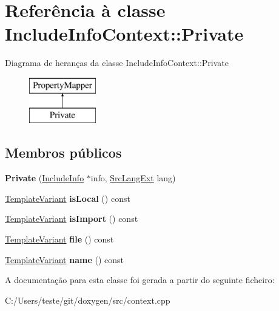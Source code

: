 \hypertarget{class_include_info_context_1_1_private}{\section{Referência à classe Include\-Info\-Context\-:\-:Private}
\label{class_include_info_context_1_1_private}
}
Diagrama de heranças da classe Include\-Info\-Context\-:\-:Private\begin{figure}[H]
\begin{center}
\leavevmode
\includegraphics[height=2.000000cm]{class_include_info_context_1_1_private}
\end{center}
\end{figure}
\subsection*{Membros públicos}
\begin{DoxyCompactItemize}
\item 
\hypertarget{class_include_info_context_1_1_private_a4fa02fa735d1d434b4f972f964b04adf}{{\bfseries Private} (\hyperlink{struct_include_info}{Include\-Info} $\ast$info, \hyperlink{types_8h_a9974623ce72fc23df5d64426b9178bf2}{Src\-Lang\-Ext} lang)}\label{class_include_info_context_1_1_private_a4fa02fa735d1d434b4f972f964b04adf}

\item 
\hypertarget{class_include_info_context_1_1_private_af21a845e4e534717dcceb26e91201278}{\hyperlink{class_template_variant}{Template\-Variant} {\bfseries is\-Local} () const }\label{class_include_info_context_1_1_private_af21a845e4e534717dcceb26e91201278}

\item 
\hypertarget{class_include_info_context_1_1_private_a9dc2271b895a155912149db56d6e6c4d}{\hyperlink{class_template_variant}{Template\-Variant} {\bfseries is\-Import} () const }\label{class_include_info_context_1_1_private_a9dc2271b895a155912149db56d6e6c4d}

\item 
\hypertarget{class_include_info_context_1_1_private_aa0b80d50e47142a9b9a0dd67fa4b2bb0}{\hyperlink{class_template_variant}{Template\-Variant} {\bfseries file} () const }\label{class_include_info_context_1_1_private_aa0b80d50e47142a9b9a0dd67fa4b2bb0}

\item 
\hypertarget{class_include_info_context_1_1_private_af98912d3b2af14adadc5c221338ec7e9}{\hyperlink{class_template_variant}{Template\-Variant} {\bfseries name} () const }\label{class_include_info_context_1_1_private_af98912d3b2af14adadc5c221338ec7e9}

\end{DoxyCompactItemize}


A documentação para esta classe foi gerada a partir do seguinte ficheiro\-:\begin{DoxyCompactItemize}
\item 
C\-:/\-Users/teste/git/doxygen/src/context.\-cpp\end{DoxyCompactItemize}
